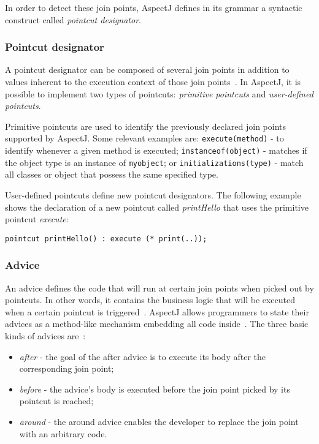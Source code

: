 \documentclass{template}
\begin{document}
In order to detect these join points, AspectJ defines in its grammar a syntactic construct called \textit{pointcut designator}.

\subsubsection{Pointcut designator}

A pointcut designator can be composed of several join points in addition to values inherent to the execution context of those join points~\cite{Kiczales97aspect-orientedprogramming}. In AspectJ, it is possible to implement two types of pointcuts: \textit{primitive pointcuts} and \textit{user-defined pointcuts}.

Primitive pointcuts are used to identify the previously declared join points supported by AspectJ. Some relevant examples are: \texttt{execute(method)} - to identify whenever a given method is executed; \texttt{instanceof(object)} - matches if the object type is an instance of \texttt{myobject}; or \texttt{initializations(type)} - match all classes or object that possess the same specified type.

User-defined pointcuts define new pointcut designators. The following example shows the declaration of a new pointcut called \textit{printHello} that uses the primitive pointcut \textit{execute}: 

\verb!pointcut printHello() : execute (* print(..));!

\subsubsection{Advice}

An advice defines the code that will run at certain join points when picked out by pointcuts. In other words, it contains the business logic that will be executed when a certain pointcut is triggered~\cite{Kiselev2002}. AspectJ allows programmers to state their advices as a method-like mechanism embedding all code inside~\cite{Kiczales97aspect-orientedprogramming}. The three basic kinds of advices are~\cite{Kiselev2002}:

\begin{itemize}
\item \textit{after} - the goal of the after advice is to execute its body after the corresponding join point;
\item \textit{before} - the advice's body is executed before the join point picked by its pointcut is reached;
\item \textit{around} - the around advice enables the developer to replace the join point with an arbitrary code.
\end{itemize}
\end{document}
